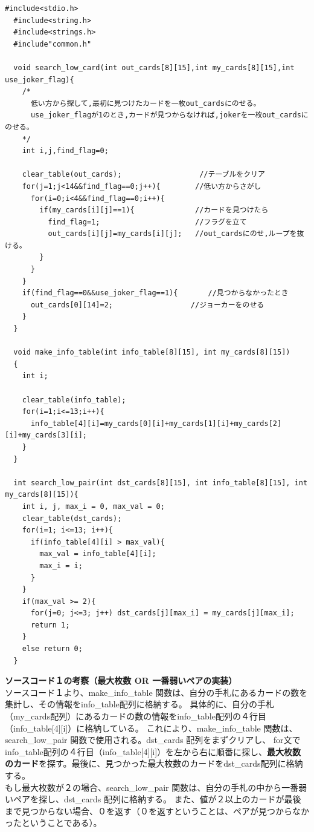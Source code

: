 \documentclass[]{jsarticle}
\begin{document}
\begin{lstlisting}[caption={daihinmin.c}]
  #include<stdio.h>
  #include<string.h>
  #include<strings.h>
  #include"common.h"
  
  void search_low_card(int out_cards[8][15],int my_cards[8][15],int use_joker_flag){
    /*
      低い方から探して,最初に見つけたカードを一枚out_cardsにのせる。
      use_joker_flagが1のとき,カードが見つからなければ,jokerを一枚out_cardsにのせる。
    */
    int i,j,find_flag=0;
  
    clear_table(out_cards);                  //テーブルをクリア
    for(j=1;j<14&&find_flag==0;j++){        //低い方からさがし
      for(i=0;i<4&&find_flag==0;i++){
        if(my_cards[i][j]==1){              //カードを見つけたら               
          find_flag=1;                      //フラグを立て
          out_cards[i][j]=my_cards[i][j];   //out_cardsにのせ,ループを抜ける。
        }
      }
    }
    if(find_flag==0&&use_joker_flag==1){       //見つからなかったとき
      out_cards[0][14]=2;                  //ジョーカーをのせる
    }
  }
  
  void make_info_table(int info_table[8][15], int my_cards[8][15])
  {
    int i;
  
    clear_table(info_table);
    for(i=1;i<=13;i++){
      info_table[4][i]=my_cards[0][i]+my_cards[1][i]+my_cards[2][i]+my_cards[3][i];
    }
  }
  
  int search_low_pair(int dst_cards[8][15], int info_table[8][15], int my_cards[8][15]){
    int i, j, max_i = 0, max_val = 0;
    clear_table(dst_cards);
    for(i=1; i<=13; i++){
      if(info_table[4][i] > max_val){
        max_val = info_table[4][i];
        max_i = i;
      }
    }
    if(max_val >= 2){
      for(j=0; j<=3; j++) dst_cards[j][max_i] = my_cards[j][max_i];
      return 1;
    }
    else return 0;
  }
\end{lstlisting}

\vspace*{1\baselineskip}
\noindent\textbf{ソースコード１の考察（最大枚数 OR 一番弱いペアの実装）}\\
\indent ソースコード１より、make\_info\_table 関数は、自分の手札にあるカードの数を集計し、その情報をinfo\_table配列に格納する。
具体的に、自分の手札（my\_cards配列）にあるカードの数の情報をinfo\_table配列の４行目（info\_table[4][i]）に格納している。
これにより、make\_info\_table 関数は、search\_low\_pair 関数で使用される。dst\_cards 配列をまずクリアし、
for文でinfo\_table配列の４行目（info\_table[4][i]）を左から右に順番に探し、\textbf{最大枚数のカード}を探す。最後に、見つかった最大枚数のカードをdst\_cards配列に格納する。\\
もし最大枚数が２の場合、search\_low\_pair 関数は、自分の手札の中から一番弱いペアを探し、dst\_cards 配列に格納する。
また、値が２以上のカードが最後まで見つからない場合、０を返す（０を返すということは、ペアが見つからなかったということである）。\\
\end{document}
